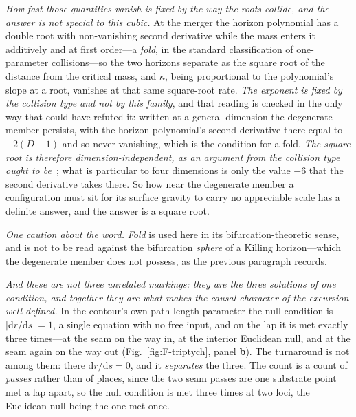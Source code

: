 \documentclass[11pt,a4paper]{article}
\theoremstyle{plain}
\theoremstyle{definition}
\theoremstyle{remark}
\newcommand{\dd}{\mathrm{d}}
\begin{document}
\emph{How fast those quantities vanish is fixed by the way the roots collide, and the answer is not special to
this cubic.} At the merger the horizon polynomial has a double root with non-vanishing second derivative while
the mass enters it additively and at first order---a \emph{fold}, in the standard classification of
one-parameter collisions---so the two horizons separate as the square root of the distance from the critical
mass, and $\kappa$, being proportional to the polynomial's slope at a root, vanishes at that same square-root
rate. \emph{The exponent is fixed by the collision type and
not by this family}, and that reading is checked in the only way that could have refuted it: written at a
general dimension the degenerate member persists, with the horizon polynomial's second derivative there equal
to $-2(D-1)$ and so never vanishing, which is the condition for a fold. \emph{The square root is therefore
dimension-independent, as an argument from the collision type ought to be}~\cite{JanzenSlicing}; what is
particular to four dimensions is only the value $-6$ that the second derivative takes there. So how near the
degenerate member a configuration must sit for its surface gravity to carry no appreciable scale has a definite
answer, and the answer is a square root.

\emph{One caution about the word.} \emph{Fold} is used here in its bifurcation-theoretic sense, and is not to
be read against the bifurcation \emph{sphere} of a Killing horizon---which the degenerate member does not
possess, as the previous paragraph records.

\emph{And these are not three unrelated markings: they are the three solutions of one condition, and together
they are what makes the causal character of the excursion well defined.} In the contour's own path-length
parameter the null condition is $|\dd r/\dd s|=1$, a single equation with no free input, and on the lap it is
met exactly three times---at the seam on the way in, at the interior Euclidean null, and at the seam again on
the way out (Fig.~\ref{fig:F-triptych}, panel \textbf{b}). The turnaround is not among them: there
$\dd r/\dd s=0$, and it \emph{separates} the three. The count is a count of \emph{passes} rather than of
places, since the two seam passes are one substrate point met a lap apart, so the null condition is met three
times at two loci, the Euclidean null being the one met once.
\end{document}
